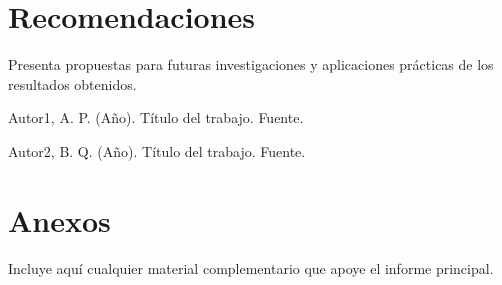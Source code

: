 \documentclass[12pt,a4paper]{article} \usepackage[spanish]{babel} \usepackage{graphicx} \usepackage{amsmath} \usepackage{amsfonts} \usepackage{amssymb} \usepackage{float} \usepackage{geometry}
\begin{document}
\section{Recomendaciones}

Presenta propuestas para futuras investigaciones y aplicaciones prácticas de los resultados obtenidos.

\vspace{-1em} \hrulefill

\begin{thebibliography}{99}

 Autor1, A. P. (Año). Título del trabajo. Fuente.

 Autor2, B. Q. (Año). Título del trabajo. Fuente.

\end{thebibliography}

\vspace{-1em} \hrulefill

\appendix

\section{Anexos}

Incluye aquí cualquier material complementario que apoye el informe principal.
\end{document}
